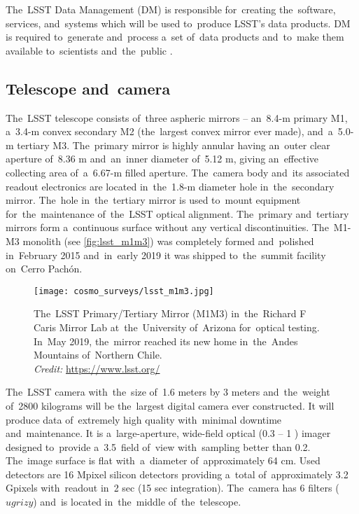 The~LSST Data Management (DM) is responsible for~creating the~software, services, and~systems which will be used to~produce LSST's data products. DM is required to~generate and~process a~set of~data products and~to~make them available to~scientists and~the~public \parencite{LSST_DM}.

\subsection{Telescope and~camera}
The~LSST telescope consists of~three aspheric mirrors -- an~8.4-m primary M1, a~3.4-m convex secondary M2 (the~largest convex mirror ever made), and~a~5.0-m tertiary M3. The~primary mirror is highly annular having an~outer clear aperture of~8.36 m and~an~inner diameter of~5.12 m, giving an~effective collecting area of~a~6.67-m filled aperture. The~camera body and~its associated readout electronics are located in~the~1.8-m diameter hole in~the~secondary mirror.  The~hole in~the~tertiary mirror is used to~mount equipment for~the~maintenance of~the~LSST optical alignment. The~primary and~tertiary mirrors form a~continuous surface without any vertical discontinuities. The~M1-M3 monolith (see \autoref{fig:lsst_m1m3}) was completely formed and~polished in~February 2015 and~in~early 2019 it was shipped to~the~summit facility on~Cerro Pach\'{o}n.
\begin{figure}[htb]
    \centering
    \texttt{[image: cosmo\_surveys/lsst\_m1m3.jpg]}
    \caption{The~LSST Primary/Tertiary Mirror (M1M3) in~the~Richard F Caris Mirror Lab at~the~University of~Arizona for~optical testing. In~May 2019, the~mirror reached its new home in~the~Andes Mountains of~Northern Chile.\\\textit{Credit:} \url{https://www.lsst.org/}}
    \label{fig:lsst_m1m3}
\end{figure}

The~LSST camera with~the~size of~1.6 meters by 3 meters and~the~weight of~2800 kilograms will be the~largest digital camera ever constructed. It will produce data of~extremely high quality with~minimal downtime and~maintenance. It is a~large-aperture, wide-field optical (0.3 -- 1 \um) imager designed to~provide a~3.5\textdegree\ field of~view with~sampling better than 0.2\arcsec. The~image surface is flat with~a~diameter of~approximately 64 cm. Used detectors are 16 Mpixel silicon detectors providing a~total of~approximately 3.2 Gpixels with~readout in~2 sec (15 sec integration). The~camera has 6 filters ($ugrizy$) and~is located in~the~middle of~the~telescope.

